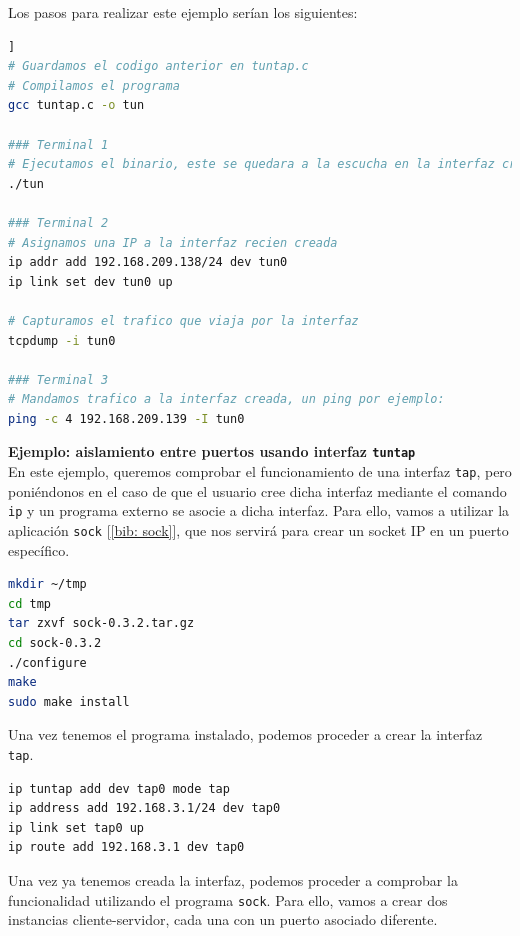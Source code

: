 \documentclass[12pt]{article}
\begin{document}
	\noindent Los pasos para realizar este ejemplo serían los siguientes:
	\begin{lstlisting}[language=Bash, label=lst: instr tuntap.c , caption=Instrucciones para realizar las pruebas con el código [\ref{lst:tuntap.c}]]
# Guardamos el codigo anterior en tuntap.c
# Compilamos el programa
gcc tuntap.c -o tun

### Terminal 1
# Ejecutamos el binario, este se quedara a la escucha en la interfaz creada
./tun

### Terminal 2
# Asignamos una IP a la interfaz recien creada
ip addr add 192.168.209.138/24 dev tun0
ip link set dev tun0 up

# Capturamos el trafico que viaja por la interfaz
tcpdump -i tun0

### Terminal 3
# Mandamos trafico a la interfaz creada, un ping por ejemplo:
ping -c 4 192.168.209.139 -I tun0
	\end{lstlisting}
	
	\pagebreak
	
	\noindent \textbf{\large Ejemplo: aislamiento entre puertos usando interfaz \texttt{tuntap}}\\
	
	\noindent En este ejemplo, queremos comprobar el funcionamiento de una interfaz \texttt{tap}, pero poniéndonos en el caso de que el usuario cree dicha interfaz mediante el comando \texttt{ip} y un programa externo se asocie a dicha interfaz. Para ello, vamos a utilizar la aplicación \texttt{sock} [\ref{bib: sock}], que nos servirá para crear un socket IP en un puerto específico.
	
	\begin{lstlisting}[language=Bash, caption={Compilar e instalar programa \texttt{sock} (\ref{bib: sock})}]
mkdir ~/tmp
cd tmp
tar zxvf sock-0.3.2.tar.gz
cd sock-0.3.2
./configure
make
sudo make install
	\end{lstlisting}

	\noindent Una vez tenemos el programa instalado, podemos proceder a crear la interfaz \texttt{tap}.
	
	\begin{lstlisting}[language=Bash, caption={Creación interfaz TAP}]
ip tuntap add dev tap0 mode tap
ip address add 192.168.3.1/24 dev tap0
ip link set tap0 up
ip route add 192.168.3.1 dev tap0
	\end{lstlisting}

	
	\noindent Una vez ya tenemos creada la interfaz, podemos proceder a comprobar la funcionalidad utilizando el programa \texttt{sock}. Para ello, vamos a crear dos instancias cliente-servidor, cada una con un puerto asociado diferente.
	
\end{document}
